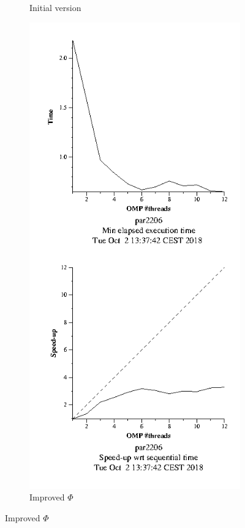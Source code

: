 \documentclass{article}
\begin{document}
\begin{figure}[htbp]
\begin{subfigure}[b]{0.35\textwidth}
        \caption{Initial version}
    \end{subfigure}
    \begin{subfigure}[b]{0.35\textwidth}
        \includegraphics[width=\textwidth]{strongimproved1.png}
        \caption{Improved $\Phi$}
    \end{subfigure}
\end{figure}
\end{document}
